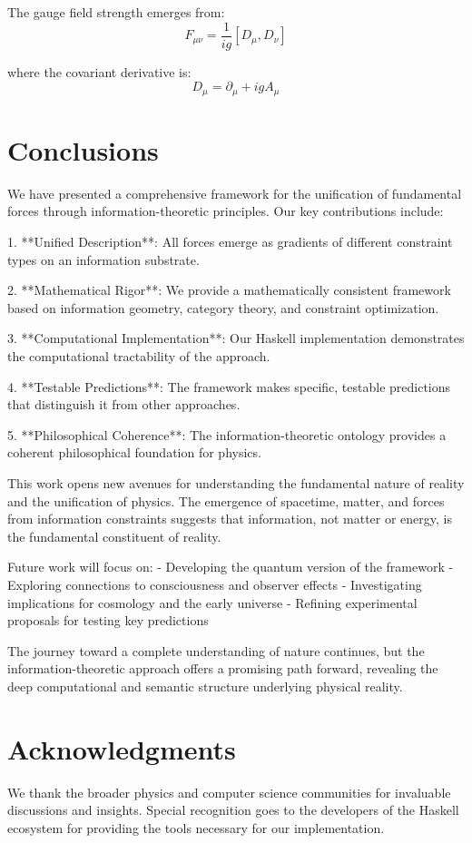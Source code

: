 \documentclass[11pt,a4paper]{article}
\begin{document}
The gauge field strength emerges from:
\begin{equation}
F_{\mu\nu} = \frac{1}{ig}[D_{\mu}, D_{\nu}]
\end{equation}

where the covariant derivative is:
\begin{equation}
D_{\mu} = \partial_{\mu} + igA_{\mu}
\end{equation}

\section{Conclusions}

We have presented a comprehensive framework for the unification of fundamental forces through information-theoretic principles. Our key contributions include:

1. **Unified Description**: All forces emerge as gradients of different constraint types on an information substrate.

2. **Mathematical Rigor**: We provide a mathematically consistent framework based on information geometry, category theory, and constraint optimization.

3. **Computational Implementation**: Our Haskell implementation demonstrates the computational tractability of the approach.

4. **Testable Predictions**: The framework makes specific, testable predictions that distinguish it from other approaches.

5. **Philosophical Coherence**: The information-theoretic ontology provides a coherent philosophical foundation for physics.

This work opens new avenues for understanding the fundamental nature of reality and the unification of physics. The emergence of spacetime, matter, and forces from information constraints suggests that information, not matter or energy, is the fundamental constituent of reality.

Future work will focus on:
- Developing the quantum version of the framework
- Exploring connections to consciousness and observer effects  
- Investigating implications for cosmology and the early universe
- Refining experimental proposals for testing key predictions

The journey toward a complete understanding of nature continues, but the information-theoretic approach offers a promising path forward, revealing the deep computational and semantic structure underlying physical reality.

\section*{Acknowledgments}

We thank the broader physics and computer science communities for invaluable discussions and insights. Special recognition goes to the developers of the Haskell ecosystem for providing the tools necessary for our implementation.



\end{document}
